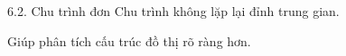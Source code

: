 \documentclass{beamer}
\begin{document}
\begin{frame}{6.2. Chu trình đơn}
\Large
Chu trình không lặp lại đỉnh trung gian.

\vspace{0.3cm}
Giúp phân tích cấu trúc đồ thị rõ ràng hơn.
\end{frame}
\end{document}
